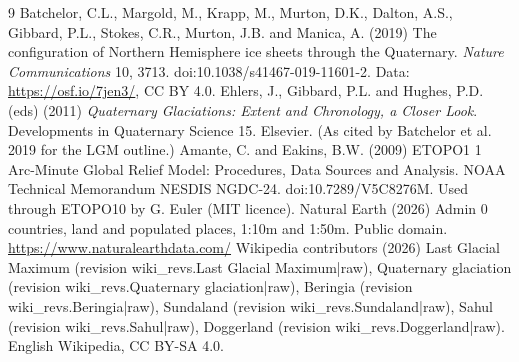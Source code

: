 \documentclass[11pt,a4paper]{article}
\begin{document}
\begin{thebibliography}{9}
 Batchelor, C.L., Margold, M., Krapp, M., Murton, D.K., Dalton, A.S., Gibbard, P.L., Stokes, C.R., Murton, J.B. and Manica, A. (2019) The configuration of Northern Hemisphere ice sheets through the Quaternary. \textit{Nature Communications} 10, 3713. doi:10.1038/s41467-019-11601-2. Data: \url{https://osf.io/7jen3/}, CC BY 4.0.
 Ehlers, J., Gibbard, P.L. and Hughes, P.D. (eds) (2011) \textit{Quaternary Glaciations: Extent and Chronology, a Closer Look}. Developments in Quaternary Science 15. Elsevier. (As cited by Batchelor et al. 2019 for the LGM outline.)
 Amante, C. and Eakins, B.W. (2009) ETOPO1 1 Arc-Minute Global Relief Model: Procedures, Data Sources and Analysis. NOAA Technical Memorandum NESDIS NGDC-24. doi:10.7289/V5C8276M. Used through ETOPO10 by G. Euler (MIT licence).
 Natural Earth (2026) Admin 0 countries, land and populated places, 1:10m and 1:50m. Public domain. \url{https://www.naturalearthdata.com/}
 Wikipedia contributors (2026) Last Glacial Maximum (revision {{wiki_revs.Last Glacial Maximum|raw}}), Quaternary glaciation (revision {{wiki_revs.Quaternary glaciation|raw}}), Beringia (revision {{wiki_revs.Beringia|raw}}), Sundaland (revision {{wiki_revs.Sundaland|raw}}), Sahul (revision {{wiki_revs.Sahul|raw}}), Doggerland (revision {{wiki_revs.Doggerland|raw}}). English Wikipedia, CC BY-SA 4.0.
\end{thebibliography}
\end{document}
